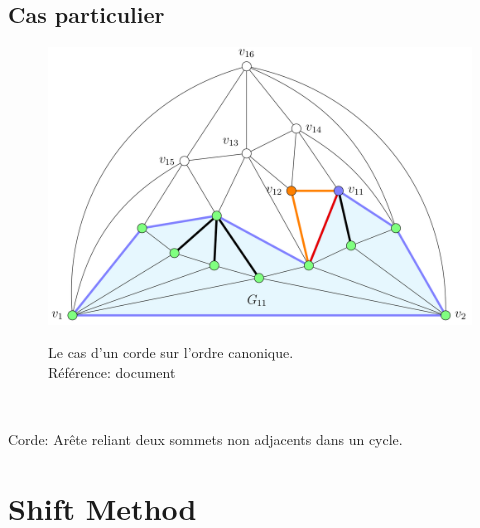\documentclass[10pt]{beamer}
\begin{document}
\subsection{Cas particulier}	
{
\begin{frame}{}
	\begin{figure}
		\centering
		\includegraphics[height=0.7\textheight]{oc2.png}\\[-0.2cm]
\caption[caption]{Le cas d'un corde sur l'ordre canonique. \\\vspace*{0.1cm} Référence: document \citeauthor{PhilippKindermann}}	

	\end{figure}
\\[-0.5cm]
 \centering
\begin{minipage}{0.8\textwidth}
\begin{block}{}
Corde: Arête reliant deux sommets non adjacents dans un cycle.
\end{block}
\end{minipage}

\end{frame}
}

\section[Shift Method]{Shift Method}
\end{document}
